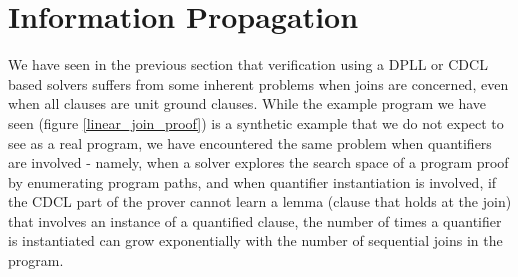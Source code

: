 \newpage
\section{Information Propagation}\label{section:ugfole:propagation}
We have seen in the previous section that verification using a DPLL or CDCL based solvers suffers from some inherent problems when joins are concerned, even when all clauses are unit ground clauses. 
While the example program we have seen (figure \ref{linear_join_proof}) is a synthetic example that we do not expect to see as a real program, we have encountered the same problem when quantifiers are involved - namely, 
when a solver explores the search space of a program proof by enumerating program paths, and when quantifier instantiation is involved, 
if the CDCL part of the prover cannot learn a lemma (clause that holds at the join) that involves an instance of a quantified clause, the number of times a quantifier is instantiated can grow exponentially with the number of sequential joins in the program.

